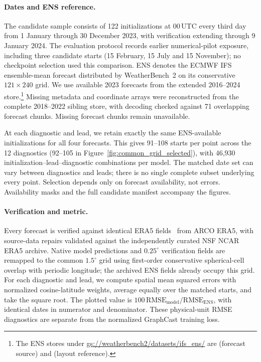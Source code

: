 \paragraph{Dates and ENS reference.}
The candidate sample consists of 122 initializations at 00\,UTC every third day from 1 January through 30 December 2023, with verification extending through 9 January 2024. The evaluation protocol records earlier numerical-pilot exposure, including three candidate starts (15 February, 15 July and 15 November); no checkpoint selection used this comparison. ENS denotes the ECMWF IFS ensemble-mean forecast distributed by WeatherBench~2 on its conservative $121\times240$ grid. We use available 2023 forecasts from the extended 2016--2024 store.\footnote{\raggedright The ENS stores under \url{gs://weatherbench2/datasets/ifs_ens/} are  (forecast source) and  (layout reference).} Missing metadata and coordinate arrays were reconstructed from the complete 2018--2022 sibling store, with decoding checked against 71 overlapping forecast chunks. Missing forecast chunks remain unavailable.

At each diagnostic and lead, we retain exactly the same ENS-available initializations for all four forecasts. This gives 91--108 starts per point across the 12 diagnostics (92--105 in Figure~\ref{fig:common_grid_selected}), with 46,930 initialization--lead--diagnostic combinations per model. The matched date set can vary between diagnostics and leads; there is no single complete subset underlying every point. Selection depends only on forecast availability, not errors. Availability masks and the full candidate manifest accompany the figures.

\paragraph{Verification and metric.}
Every forecast is verified against identical ERA5 fields~\citep{hersbach2020era5} from ARCO ERA5, with source-data repairs validated against the independently curated NSF NCAR ERA5 archive. Native model predictions and $0.25^\circ$ verification fields are remapped to the common $1.5^\circ$ grid using first-order conservative spherical-cell overlap with periodic longitude; the archived ENS fields already occupy this grid. For each diagnostic and lead, we compute spatial mean squared errors with normalized cosine-latitude weights, average equally over the matched starts, and take the square root. The plotted value is $100\,\mathrm{RMSE}_{\mathrm{model}}/\mathrm{RMSE}_{\mathrm{ENS}}$, with identical dates in numerator and denominator. These physical-unit RMSE diagnostics are separate from the normalized GraphCast training loss.

